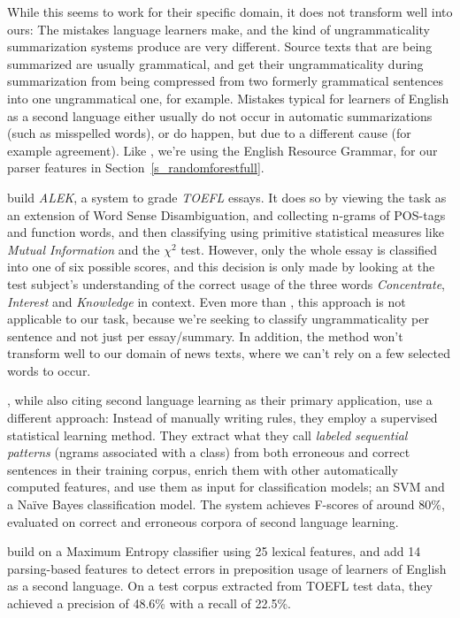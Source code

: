 \documentclass[a4paper,10pt]{scrartcl}
\theoremstyle{style}
\begin{document}
While this seems to work for their specific domain, it does not transform well into ours: The mistakes language learners make, and the kind of ungrammaticality summarization systems produce are very different. Source texts that are being summarized are usually grammatical, and get their ungrammaticality during summarization from being compressed from two formerly grammatical sentences into one ungrammatical one, for example. Mistakes typical for learners of English as a second language either usually do not occur in automatic summarizations (such as misspelled words), or do happen, but due to a different cause (for example agreement). Like \cite{bender2004arboretum}, we're using the English Resource Grammar, for our parser features in Section~\ref{s_randomforestfull}.

\cite{chodorow2000unsupervised} build \textit{ALEK}, a system to grade \textit{TOEFL} essays. It does so by viewing the task as an extension of Word Sense Disambiguation, and collecting n-grams of POS-tags and function words, and then classifying using primitive statistical measures like \textit{Mutual Information} and the $\chi^2$ test. However, only the whole essay is classified into one of six possible scores, and this decision is only made by looking at the test subject's understanding of the correct usage of the three words \textit{Concentrate}, \textit{Interest} and \textit{Knowledge} in context.
Even more than \cite{bender2004arboretum}, this approach is not applicable to our task, because we're seeking to classify ungrammaticality per sentence and not just per essay/summary. In addition, the method won't transform well to our domain of news texts, where we can't rely on a few selected words to occur.

\cite{sun2007detecting}, while also citing second language learning as their primary application, use a different approach: Instead of manually writing rules, they employ a supervised statistical learning method. They extract what they call \textit{labeled sequential patterns} (ngrams associated with a class) from both erroneous and correct sentences in their training corpus, enrich them with other automatically computed features, and use them as input for classification models; an SVM \citep[SVMlight,][]{Joachims/02a} and a Na\"ive Bayes classification model. The system achieves F-scores of around 80\%, evaluated on correct and erroneous corpora of second language learning.

\cite{tetreault2010using} build on a Maximum Entropy classifier using 25 lexical features, and add 14 parsing-based features to detect errors in preposition usage of learners of English as a second language. On a test corpus extracted from TOEFL test data, they achieved a precision of 48.6\% with a recall of 22.5\%.
\end{document}
